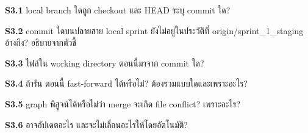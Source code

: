 \textbf{S3.1} local branch ใดถูก checkout และ HEAD ระบุ commit ใด?\par
\blankbox{1.5cm}
\textbf{S3.2} commit ใดบนปลายสาย local sprint ยังไม่อยู่ในประวัติที่ origin/sprint\_1\_staging อ้างถึง? อธิบายจากตัวชี้\par
\blankbox{1.8cm}
\textbf{S3.3} ไฟล์ใน working directory ตอนนี้มาจาก commit ใด?\par
\blankbox{1.5cm}
\textbf{S3.4} ถ้ารัน  ตอนนี้ fast-forward ได้หรือไม่? ต้องรวมแบบใดและเพราะอะไร?\par
\blankbox{2cm}
\textbf{S3.5} graph พิสูจน์ได้หรือไม่ว่า merge จะเกิด file conflict? เพราะอะไร?\par
\blankbox{1.5cm}
\textbf{S3.6}  อาจอัปเดตอะไร และจะไม่เลื่อนอะไรให้โดยอัตโนมัติ?\par
\blankbox{2cm}
